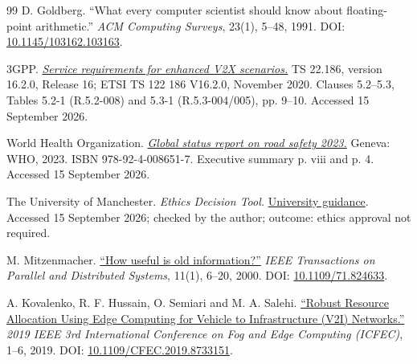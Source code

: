 \documentclass[12pt,a4paper]{article}
\begin{document}
\begin{thebibliography}{99}
 D. Goldberg. ``What every computer scientist should know about floating-point arithmetic.'' \emph{ACM Computing Surveys}, 23(1), 5--48, 1991. DOI: \href{\detokenize{https://doi.org/10.1145/103162.103163}}{10.1145/103162.103163}.

 3GPP. \href{\detokenize{https://www.etsi.org/deliver/etsi_ts/122100_122199/122186/16.02.00_60/ts_122186v160200p.pdf}}{\emph{Service requirements for enhanced V2X scenarios.}} TS 22.186, version 16.2.0, Release 16; ETSI TS 122 186 V16.2.0, November 2020. Clauses 5.2--5.3, Tables 5.2-1 (R.5.2-008) and 5.3-1 (R.5.3-004/005), pp. 9--10. Accessed 15 September 2026.

 World Health Organization. \href{\detokenize{https://iris.who.int/server/api/core/bitstreams/46275f9f-ef66-4892-8ddd-a496ef8c1b74/content}}{\emph{Global status report on road safety 2023.}} Geneva: WHO, 2023. ISBN 978-92-4-008651-7. Executive summary p. viii and p. 4. Accessed 15 September 2026.

 The University of Manchester. \emph{Ethics Decision Tool.} \href{\detokenize{https://www.manchester.ac.uk/research/environment/governance/ethics/approval/}}{University guidance}. Accessed 15 September 2026; checked by the author; outcome: ethics approval not required.

 M. Mitzenmacher. \href{\detokenize{https://www.eecs.harvard.edu/~michaelm/NEWWORK/postscripts/oldinfo-jver-submit.pdf}}{``How useful is old information?''} \emph{IEEE Transactions on Parallel and Distributed Systems}, 11(1), 6--20, 2000. DOI: \href{\detokenize{https://doi.org/10.1109/71.824633}}{10.1109/71.824633}.

 A. Kovalenko, R. F. Hussain, O. Semiari and M. A. Salehi. \href{\detokenize{https://arxiv.org/abs/1905.04458v1}}{``Robust Resource Allocation Using Edge Computing for Vehicle to Infrastructure (V2I) Networks.''} \emph{2019 IEEE 3rd International Conference on Fog and Edge Computing (ICFEC)}, 1--6, 2019. DOI: \href{\detokenize{https://doi.org/10.1109/CFEC.2019.8733151}}{10.1109/CFEC.2019.8733151}.


\end{thebibliography}
\end{document}
